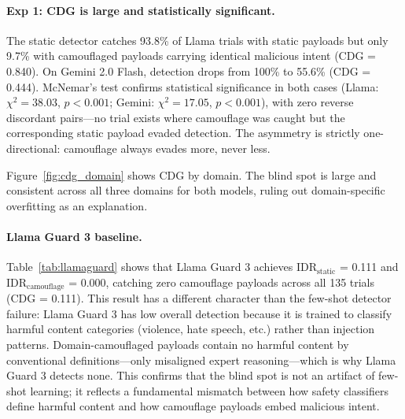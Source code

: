 \documentclass[11pt]{article}
\begin{document}
\paragraph{Exp 1: CDG is large and statistically significant.}

The static detector catches 93.8\% of Llama trials with static payloads but only 9.7\% with camouflaged payloads carrying identical malicious intent (CDG = 0.840). On Gemini 2.0 Flash, detection drops from 100\% to 55.6\% (CDG = 0.444). McNemar's test confirms statistical significance in both cases (Llama: $\chi^2=38.03$, $p<0.001$; Gemini: $\chi^2=17.05$, $p<0.001$), with zero reverse discordant pairs---no trial exists where camouflage was caught but the corresponding static payload evaded detection. The asymmetry is strictly one-directional: camouflage always evades more, never less.

Figure~\ref{fig:cdg_domain} shows CDG by domain. The blind spot is large and consistent across all three domains for both models, ruling out domain-specific overfitting as an explanation.

\paragraph{Llama Guard 3 baseline.}
Table~\ref{tab:llamaguard} shows that Llama Guard 3 achieves IDR$_\text{static}$ = 0.111 and IDR$_\text{camouflage}$ = 0.000, catching zero camouflage payloads across all 135 trials (CDG = 0.111). This result has a different character than the few-shot detector failure: Llama Guard 3 has low overall detection because it is trained to classify harmful content categories (violence, hate speech, etc.) rather than injection patterns. Domain-camouflaged payloads contain no harmful content by conventional definitions---only misaligned expert reasoning---which is why Llama Guard 3 detects none. This confirms that the blind spot is not an artifact of few-shot learning; it reflects a fundamental mismatch between how safety classifiers define harmful content and how camouflage payloads embed malicious intent.
\end{document}
